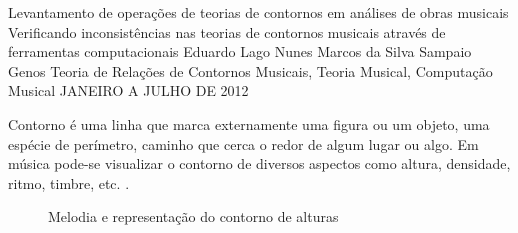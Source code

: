 \documentclass[11pt]{article}
\begin{document}
\graphicspath{{figs/}}


\dadosRelatorioFinal
{Levantamento de operações de teorias de contornos em análises de
  obras musicais}
{Verificando inconsistências nas teorias de contornos musicais através
  de ferramentas computacionais }
{Eduardo Lago Nunes}
{Marcos da Silva Sampaio}
{Genos}
{Teoria de Relações de Contornos Musicais, Teoria Musical, Computação Musical}
{JANEIRO A JULHO DE 2012}


\newpage

\setcounter{page}{1}
\onehalfspace

\label{sec:introducao}

Contorno é uma linha que marca externamente uma figura ou um objeto, uma espécie
de perímetro, caminho que cerca o redor de algum lugar ou algo. Em música pode-se
visualizar o contorno de diversos aspectos como altura, densidade, ritmo, timbre, etc.
\cite[p. 01]{Sampaio2008}.

\begin{figure}
  \centering
  \caption{Melodia e representação do contorno de alturas}
  \label{fig:melodia-representacao}
\end{figure}
\end{document}
